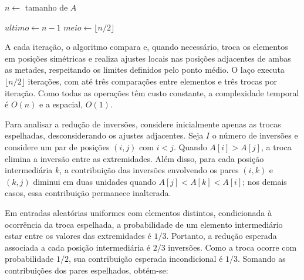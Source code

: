 \documentclass[12pt]{article}
\begin{document}
\begin{algorithm}[H]
\caption{Algoritmo de Pré-Processamento Simétrico}
\label{alg:preproc}

\SetAlgoLined


$n \gets$ tamanho de $A$\;


$ultimo \gets n - 1$\;
$meio \gets \lfloor n/2 \rfloor$\;


\end{algorithm}
A cada iteração, o algoritmo compara e, quando necessário, troca os elementos em posições simétricas e realiza ajustes locais nas posições adjacentes de ambas as metades, respeitando os limites definidos pelo ponto médio. O laço executa $\lfloor n/2 \rfloor$ iterações, com até três comparações entre elementos e três trocas por iteração. Como todas as operações têm custo constante, a complexidade temporal é $O(n)$ e a espacial, $O(1)$.

Para analisar a redução de inversões, considere inicialmente apenas as trocas espelhadas, desconsiderando os ajustes adjacentes. Seja $I$ o número de inversões e considere um par de posições $(i,j)$ com $i<j$. Quando $A[i]>A[j]$, a troca elimina a inversão entre as extremidades. Além disso, para cada posição intermediária $k$, a contribuição das inversões envolvendo os pares $(i,k)$ e $(k,j)$ diminui em duas unidades quando $A[j]<A[k]<A[i]$; nos demais casos, essa contribuição permanece inalterada.

Em entradas aleatórias uniformes com elementos distintos, condicionada à ocorrência da troca espelhada, a probabilidade de um elemento intermediário estar entre os valores das extremidades é $1/3$. Portanto, a redução esperada associada a cada posição intermediária é $2/3$ inversões. Como a troca ocorre com probabilidade $1/2$, sua contribuição esperada incondicional é $1/3$. Somando as contribuições dos pares espelhados, obtém-se:
\end{document}
